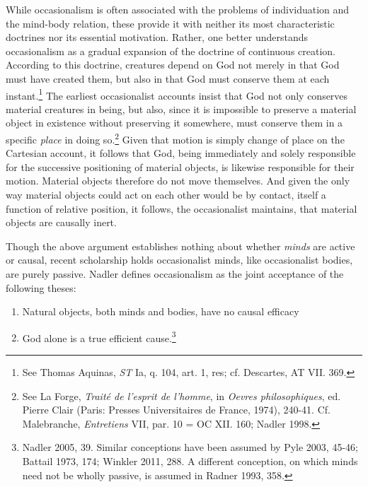 \documentclass{article}
\begin{document}
While occasionalism is often associated with the problems of
individuation and the mind-body relation, these provide it with neither
its most characteristic doctrines nor its essential motivation. Rather,
one better understands occasionalism as a gradual expansion of the
doctrine of continuous creation. According to this doctrine, creatures
depend on God not merely in that God must have created them, but also in
that God must conserve them at each instant.\footnote{See Thomas
  Aquinas, \emph{ST} Ia, q. 104, art. 1, res; cf. Descartes, AT VII.
  369.} The earliest occasionalist accounts insist that God not only
conserves material creatures in being, but also, since it is impossible
to preserve a material object in existence without preserving it
somewhere, must conserve them in a specific \emph{place} in doing
so.\footnote{See La Forge, \emph{Traité de l'esprit de l'homme}, in
  \emph{Oevres philosophiques}, ed. Pierre Clair (Paris: Presses
  Universitaires de France, 1974), 240-41. Cf. Malebranche,
  \emph{Entretiens} VII, par. 10 = OC XII. 160; Nadler 1998.} Given that
motion is simply change of place on the Cartesian account, it follows
that God, being immediately and solely responsible for the successive
positioning of material objects, is likewise responsible for their
motion. Material objects therefore do not move themselves. And given the
only way material objects could act on each other would be by contact,
itself a function of relative position, it follows, the occasionalist
maintains, that material objects are causally inert.

Though the above argument establishes nothing about whether \emph{minds}
are active or causal, recent scholarship holds occasionalist minds, like
occasionalist bodies, are purely passive. Nadler defines occasionalism
as the joint acceptance of the following theses:

\begin{enumerate}
\item
  Natural objects, both minds and bodies, have no causal efficacy
\item
  God alone is a true efficient cause.\footnote{Nadler 2005, 39. Similar
    conceptions have been assumed by Pyle 2003, 45-46; Battail 1973,
    174; Winkler 2011, 288. A different conception, on which minds need
    not be wholly passive, is assumed in Radner 1993, 358.}
\end{enumerate}
\end{document}
